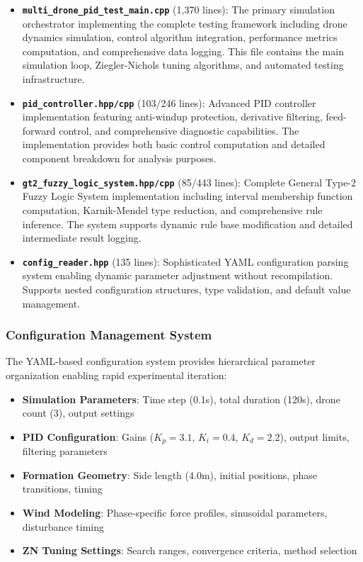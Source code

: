 \begin{itemize}
    \item \textbf{\texttt{multi\_drone\_pid\_test\_main.cpp}} (1,370 lines): The primary simulation orchestrator implementing the complete testing framework including drone dynamics simulation, control algorithm integration, performance metrics computation, and comprehensive data logging. This file contains the main simulation loop, Ziegler-Nichols tuning algorithms, and automated testing infrastructure.

    \item \textbf{\texttt{pid\_controller.hpp/cpp}} (103/246 lines): Advanced PID controller implementation featuring anti-windup protection, derivative filtering, feed-forward control, and comprehensive diagnostic capabilities. The implementation provides both basic control computation and detailed component breakdown for analysis purposes.

    \item \textbf{\texttt{gt2\_fuzzy\_logic\_system.hpp/cpp}} (85/443 lines): Complete General Type-2 Fuzzy Logic System implementation including interval membership function computation, Karnik-Mendel type reduction, and comprehensive rule inference. The system supports dynamic rule base modification and detailed intermediate result logging.

    \item \textbf{\texttt{config\_reader.hpp}} (135 lines): Sophisticated YAML configuration parsing system enabling dynamic parameter adjustment without recompilation. Supports nested configuration structures, type validation, and default value management.
\end{itemize}

\subsubsection*{Configuration Management System}

The YAML-based configuration system provides hierarchical parameter organization enabling rapid experimental iteration:

\begin{itemize}
    \item \textbf{Simulation Parameters}: Time step (0.1s), total duration (120s), drone count (3), output settings
    \item \textbf{PID Configuration}: Gains ($K_p = 3.1$, $K_i = 0.4$, $K_d = 2.2$), output limits, filtering parameters
    \item \textbf{Formation Geometry}: Side length (4.0m), initial positions, phase transitions, timing
    \item \textbf{Wind Modeling}: Phase-specific force profiles, sinusoidal parameters, disturbance timing
    \item \textbf{ZN Tuning Settings}: Search ranges, convergence criteria, method selection
\end{itemize}

